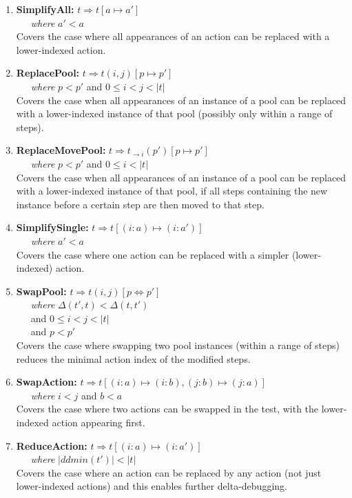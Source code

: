 \begin{enumerate}
\item {\bf SimplifyAll:}
$t \Rightarrow t[a \mapsto a']$\\
\-\ \ \ \emph{where} $a' < a$\\
Covers the case where all appearances of an action can be replaced with a 
lower-indexed action. 
\item {\bf ReplacePool:}
$t \Rightarrow t(i,j)[p \mapsto p']$\\ 
\-\ \ \ \emph{where} $p < p'$ and $0 \leq i < j <
|t|$\\
Covers the case when all appearances of an instance of a pool can be replaced with 
a lower-indexed instance of that pool (possibly only within a range of steps).
\item {\bf ReplaceMovePool:}
$t \Rightarrow t_{\rightarrow i}(p')[p \mapsto p']$\\
\-\ \ \ \emph{where} $p < p'$ and $0
\leq i < |t|$\\
Covers the case when all appearances of an instance of a pool can be replaced with
a lower-indexed instance of that pool, if all steps containing the new instance before a
certain step are then moved to that step.
\item {\bf SimplifySingle:}
$t \Rightarrow t[(i: a) \mapsto (i: a')]$\\
\-\ \ \ \emph{where} $a' < a$\\
Covers the case where one action can be replaced with a 
simpler (lower-indexed) action. 
\item {\bf SwapPool:}
$t \Rightarrow t(i,j)[p \Leftrightarrow p']$\\
\-\ \ \ \emph{where} $\Delta(t',t) < \Delta(t,t')$\\
\-\ \ \ and $0 \leq i < j < |t|$\\
\-\ \ \ and $p < p'$\\
Covers the case where swapping two pool instances (within a range of steps) reduces
the minimal action index of the modified steps.
\item {\bf SwapAction:}
$t \Rightarrow t[(i: a) \mapsto (i: b), (j: b) \mapsto (j: a)]$\\
\-\ \ \ \emph{where} $i < j$ and
$b < a$\\
Covers the case where two actions can be swapped in the test, with the
lower-indexed action appearing first.
\item {\bf ReduceAction:}
$t \Rightarrow t[(i: a) \mapsto (i: a')]$\\
\-\ \ \ \emph{where} $|ddmin(t')| < |t|$\\
Covers the case where an action can be replaced by any action (not just lower-indexed
actions) and this enables further delta-debugging.
\end{enumerate}

